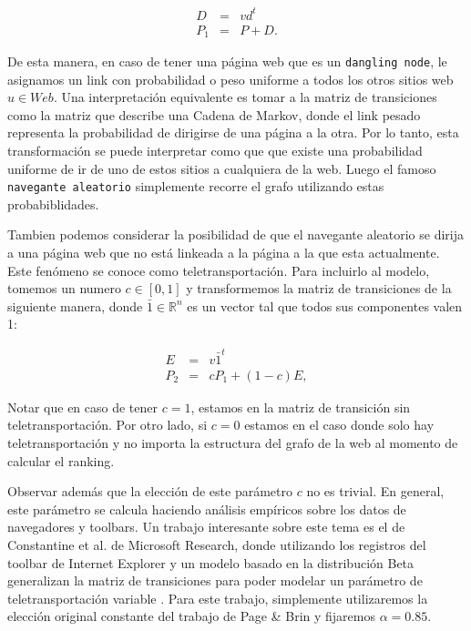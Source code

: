 \begin{eqnarray*}
D & = & v d^t \\
P_1 & = & P + D.
\end{eqnarray*}

De esta manera, en caso de tener una página web que es un \texttt{dangling node}, le asignamos un link con probabilidad o peso uniforme a todos los otros sitios web $u \in Web$. Una interpretación equivalente es tomar a la matriz de transiciones como la matriz que describe una Cadena de Markov, donde el link pesado representa la probabilidad de dirigirse de una página a la otra. Por lo tanto, esta transformación se puede interpretar como que que existe una probabilidad uniforme de ir de uno de estos sitios a cualquiera de la web. Luego el famoso \texttt{navegante aleatorio} simplemente recorre el grafo utilizando estas probabiblidades.

Tambien podemos considerar la posibilidad de que el navegante aleatorio se dirija a una página web que no está linkeada a la página a la que esta actualmente. Este fenómeno se conoce como teletransportación. Para incluirlo al modelo, tomemos un numero $c \in [0,1]$ y transformemos la matriz de transiciones de la siguiente manera, donde $\bar{1} \in \mathbb{R}^n$ es un vector tal que todos sus componentes valen 1:

\begin{eqnarray*}
E & = & v \bar{1}^t \\
P_2 & = & cP_1 + (1-c)E,
\end{eqnarray*}

Notar que en caso de tener $c=1$, estamos en la matriz de transición sin teletransportación. Por otro lado, si $c=0$ estamos en el caso donde solo hay teletransportación y no importa la estructura del grafo de la web al momento de calcular el ranking.

Observar además que la elección de este parámetro $c$ no es trivial. En general, este parámetro se calcula haciendo análisis empíricos sobre los datos de navegadores y toolbars. Un trabajo interesante sobre este tema es el de Constantine et al. de Microsoft Research, donde utilizando los registros del toolbar de Internet Explorer y un modelo basado en la distribución Beta generalizan la matriz de transiciones para poder modelar un parámetro de teletransportación variable \cite{TeleParam}. Para este trabajo, simplemente utilizaremos la elección original constante del trabajo de Page \& Brin \cite{Brin1998} y fijaremos $\alpha = 0.85$.

\pagebreak

